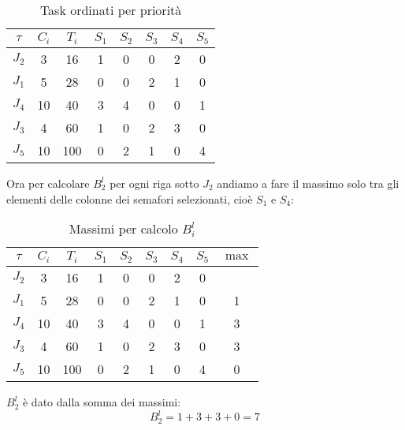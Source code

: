 \begin{Esercizio2}
\begin{table}[!h]
\centering
\caption{Task ordinati per priorità}
\begin{tabular}{|c|c|c|c|c|c|c|c|}
\hline
\(\tau\) & $C_i$ & $T_i$ & $S_1$ & $S_2$ & $S_3$ & $S_4$ & $S_5$ \\
\hline
$J_2$ & 3 & 16 & 1 & 0 & 0 & 2 & 0 \\
\arrayrulecolor{red}\hline
\arrayrulecolor{black}
$J_1$ & 5 & 28 & \cellcolor{blue!20}0 & 0 & 2 & \cellcolor{blue!20}1 & 0 \\
\hline
$J_4$ & 10 & 40 & \cellcolor{blue!20}3 & 4 & 0 & \cellcolor{blue!20}0 & 1 \\
\hline
$J_3$ & 4 & 60 & \cellcolor{blue!20}1 & 0 & 2 & \cellcolor{blue!20}3 & 0 \\
\hline
$J_5$ & 10 & 100 & \cellcolor{blue!20}0 & 2 & 1 & \cellcolor{blue!20}0 & 4 \\
\hline
\end{tabular}
\label{tab:task_periodici_esercizio}
\end{table} 

Ora per calcolare \(B_{2}^{l}\) per ogni riga sotto 
\(J_{2}\) andiamo 
a fare il massimo solo tra gli elementi delle colonne
dei semafori selezionati, cioè \(S_{1}\) e \(S_{4}\):


\begin{table}[!h]
\centering
\begin{tabular}{|c|c|c|c|c|c|c|c|c|}
\hline
\(\tau\) & $C_i$ & $T_i$ & $S_1$ & $S_2$ & $S_3$ & $S_4$ & $S_5$ & $\max$ \\
\hline
$J_2$ & 3 & 16 & 1 & 0 & 0 & 2 & 0 & \\
\arrayrulecolor{red}\hline
\arrayrulecolor{black}
$J_1$ & 5 & 28 & \cellcolor{blue!20}0 & 0 & 2 & \cellcolor{blue!20}1 & 0 & 1 \\
\hline
$J_4$ & 10 & 40 & \cellcolor{blue!20}3 & 4 & 0 & \cellcolor{blue!20}0 & 1 & 3 \\
\hline
$J_3$ & 4 & 60 & \cellcolor{blue!20}1 & 0 & 2 & \cellcolor{blue!20}3 & 0 & 3 \\
\hline
$J_5$ & 10 & 100 & \cellcolor{blue!20}0 & 2 & 1 & \cellcolor{blue!20}0 & 4 & 0 \\
\hline
\end{tabular}
\label{tab:task_periodici_esercizio}
\caption{Massimi per calcolo \(B_{i}^{l}\)}

\end{table}

\(B_{2}^{l}\) è dato dalla somma dei massimi:
\[ B_{2}^{l} = 1 + 3 + 3 + 0 = 7 \]





\end{Esercizio2}

